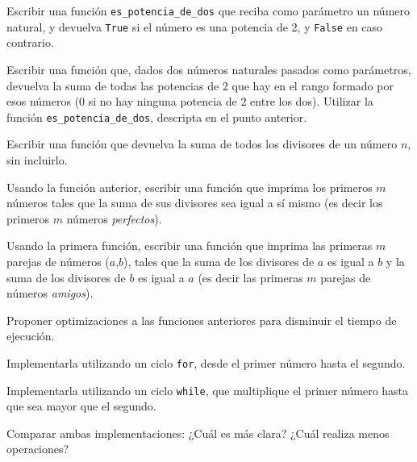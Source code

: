 \begin{partes}
    \item Escribir una función \verb!es_potencia_de_dos! que reciba como parámetro
un número natural, y devuelva \verb!True! si el número es una potencia de 2,
y \verb!False! en caso contrario.
    \item Escribir una función que, dados dos números naturales pasados como
parámetros, devuelva la suma de todas las potencias de 2 que hay en el
rango formado por esos números (0 si no hay ninguna potencia de 2 entre los
dos). Utilizar la función \verb!es_potencia_de_dos!, descripta en el
punto anterior.
\end{partes}


\begin{partes}
    \item Escribir una función que devuelva la suma de todos los divisores de
un número $n$, sin incluirlo.
    \item Usando la función anterior, escribir una función que imprima los
primeros $m$ números tales que la suma de sus divisores sea igual a sí
mismo (es decir los primeros $m$ números {\it perfectos}).
    \item Usando la primera función, escribir una función que imprima las
primeras $m$ parejas de números ($a$,$b$), tales que la suma de los
divisores de $a$ es igual a $b$ y la suma de los divisores de $b$ es igual
a $a$ (es decir las primeras $m$ parejas de números {\it amigos}).
    \item Proponer optimizaciones a las funciones anteriores para disminuir el
tiempo de ejecución.
\end{partes}


\begin{partes}
    \item Implementarla utilizando un ciclo \verb!for!, desde el primer número
hasta el segundo.
    \item Implementarla utilizando un ciclo \verb!while!, que multiplique el primer
número hasta que sea mayor que el segundo.
    \item Comparar ambas implementaciones: ¿Cuál es más clara? ¿Cuál realiza menos
operaciones?
\end{partes}


